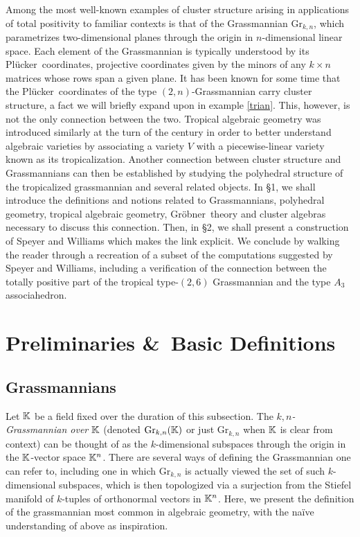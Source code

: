 \documentclass[12pt,letter]{article}
\newcommand{\gr}{\mathrm{Gr}}
\newcommand{\plu}{Pl\"ucker~}
\newcommand{\gro}{Gr\"obner~}
\begin{document}
Among the most well-known examples of cluster structure arising in applications of total positivity to familiar contexts is that of the Grassmannian $\gr_{k,n}$, which parametrizes two-dimensional planes through the origin in $n$-dimensional linear space. Each element of the Grassmannian is typically understood by its \plu coordinates, projective coordinates given by the minors of any  $k\times n$ matrices whose rows span a given plane. It has been known for some time that the \plu coordinates of the type $(2,n)$-Grassmannian carry cluster structure, a fact we will briefly expand upon in example \ref{trian}. This, however, is not the only connection between the two. Tropical algebraic geometry was introduced similarly at the turn of the century in order to better understand algebraic varieties by associating a variety $V$ with a piecewise-linear variety known as its tropicalization. Another connection between cluster structure and Grassmannians can then be established by studying the polyhedral structure of the tropicalized grassmannian and several related objects. In \S1, we shall introduce the definitions and notions related to Grassmannians, polyhedral geometry, tropical algebraic geometry, \gro theory and cluster algebras necessary to discuss this connection. Then, in \S2, we shall present a construction of Speyer and Williams which makes the link explicit. We conclude by walking the reader through a recreation of a subset of the computations suggested by Speyer and Williams, including a verification of the connection between the totally positive part of the tropical type-$(2,6)$ Grassmannian and the type $A_3$ associahedron.
\section{Preliminaries \&~Basic Definitions}

\subsection{Grassmannians}
Let ${\mathbb K}$ be a field fixed over the duration of this subsection. The \emph{$k,n$-Grassmannian over ${\mathbb K}$} (denoted $\gr_{k,n}(\KK)$ or just $\gr_{k,n}$ when ${\mathbb K}$ is clear from context) can be thought of as the $k$-dimensional subspaces through the origin in the ${\mathbb K}$-vector space ${\mathbb K}^n$. There are several ways of defining the Grassmannian one can refer to, including one \cite[\S1.2]{khat} in which $\gr_{k,n}$ is actually viewed the set of such $k$-dimensional subspaces, which is then topologized via a surjection from the Stiefel manifold of $k$-tuples of orthonormal vectors in ${\mathbb K}^n$. Here, we present the definition of the grassmannian most common in algebraic geometry,
with the na\"ive understanding of above as inspiration.
\end{document}
